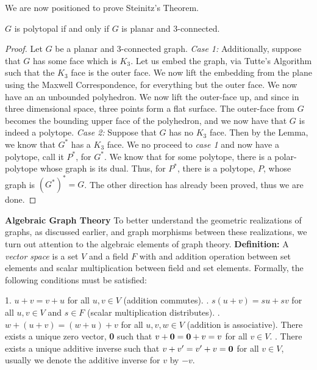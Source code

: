 \documentclass{article}
\begin{document}
 \medskip \noindent We are now positioned to prove Steinitz's Theorem.
  
  \begin{theorem}
    $G$ is polytopal if and only if $G$ is planar and 3-connected.
  \end{theorem}
  \begin{proof}
    Let $G$ be a planar and 3-connected graph. 
    \smallskip \newline \noindent \textit{Case 1:} Additionally, suppose that $G$ has some face which is $K_3$. Let us embed the graph, via Tutte's Algorithm such that the $K_3$ face is the outer face. We now lift the embedding from the plane using the Maxwell Correspondence, for everything but the outer face. We now have an an unbounded polyhedron. We now lift the outer-face up, and since in three dimensional space, three points form a flat surface. The outer-face from $G$ becomes the bounding upper face of the polyhedron, and we now have that $G$ is indeed a polytope.
    \smallskip \newline \noindent \textit{Case 2:} Suppose that $G$ has no $K_3$ face. Then by the Lemma, we know that $G^*$ has a $K_3$ face. We no proceed to \textit{case 1} and now have a polytope, call it $P^*$, for $G^*$. We know that for some polytope, there is a polar-polytope whose graph is its dual. Thus, for $P^*$, there is a polytope, $P$, whose graph is $(G^*)^* = G$. 
    \newline \noindent The other direction has already been proved, thus we are done. 
  \end{proof}

 \bigskip \noindent \textbf{Algebraic Graph Theory}
 \newline \noindent To better understand the geometric realizations of graphs, as discussed earlier, and graph morphisms between these realizations, we turn out attention to the algebraic elements of graph theory. 
 \smallskip \newline \noindent \textbf{Definition:} A \textit{vector space} is a set $V$ and a field $F$ with and addition operation between set elements and scalar multiplication between field and set elements. Formally, the following conditions must be satisfied: 
 \begin{adjustwidth}{2.5em}{0pt}
 1. $u+v=v+u$ for all $u,v \in V$ (addition commutes).
 . $s(u+v)=su+sv$ for all $u,v \in V$ and $s \in F$ (scalar multiplication distributes).
 . $w+(u+v)=(w+u)+v$ for all $u,v,w \in V$ (addition is associative).
 \newline There exists a unique zero vector, \textbf{0} such that $v+\text{\textbf{0}}=\text{\textbf{0}}+v=v$ for all $v \in V$.
 \newline {}. There exists a unique additive inverse such that $v+v' = v'+v=\text{\textbf{0}}$ for all $v \in V$, usually we denote the additive inverse for $v$ by $-v$.
\end{adjustwidth}
\end{document}
